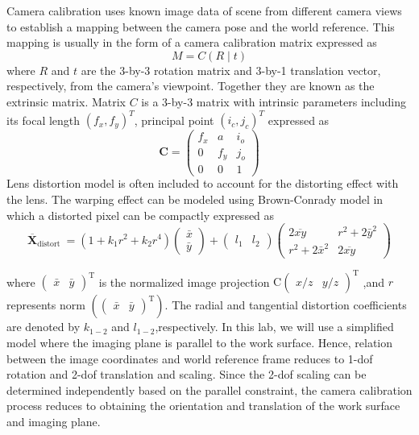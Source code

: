 Camera calibration uses known image data of scene from different camera views to
establish a mapping between the camera pose and the world reference. This mapping is
usually in the form of a camera calibration matrix expressed as
\begin{equation}
    M=C(R \mid t)
\end{equation}
where $R$ and $t$ are the 3-by-3 rotation matrix and 3-by-1 translation vector, respectively, from 
the camera's viewpoint. Together they are known as the extrinsic matrix. Matrix $C$ is a 3-by-3 matrix
with intrinsic parameters including its focal length $(f_x,f_y)^T$, principal point $(i_c,j_c)^T$
expressed as
\begin{equation}
    \mathbf{C}=\left(\begin{array}{ccc}
    f_{x} & a & i_{o} \\
    0 & f_{y} & j_{o} \\
    0 & 0 & 1
    \end{array}\right)
\end{equation}
Lens distortion model is often included to account for the distorting effect with the lens.
The warping effect can be modeled using Brown-Conrady model in which a distorted pixel
can be compactly expressed as
\begin{equation}
    \overline{\mathbf{X}}_{\text {distort }}=\left(1+k_{1} r^{2}+k_{2} r^{4}\right)\left(\begin{array}{l}
    \bar{x} \\
    \bar{y}
    \end{array}\right)+\left(\begin{array}{ll}
    l_{1} & l_{2}
    \end{array}\right)\left(\begin{array}{cc}
    2 \overline{x y} & r^{2}+2 \bar{y}^{2} \\
    r^{2}+2 \bar{x}^{2} & 2 \overline{x y}
    \end{array}\right)
\end{equation}

where $\left(\begin{array}{ll}\bar{x} & \bar{y}\end{array}\right)^{\mathrm{T}}$ is the normalized image projection $\mathrm{C}\left(\begin{array}{ll}x / z & y / z\end{array}\right)^{\mathrm{T}}$
,and $r$ represents norm $\left(\left(\begin{array}{ll}\bar{x} & \bar{y}\end{array}\right)^{\mathrm{T}}\right)$.
The radial and tangential distortion coefficients are denoted by $k_{1-2}$ and $l_{1-2}$,respectively.
In this lab, we will use a simplified model where the imaging plane is parallel to the work
surface. Hence, relation between the image coordinates and world reference frame reduces
to 1-dof rotation and 2-dof translation and scaling. Since the 2-dof scaling can be
determined independently based on the parallel constraint, the camera calibration process
reduces to obtaining the orientation and translation of the work surface and imaging plane.



